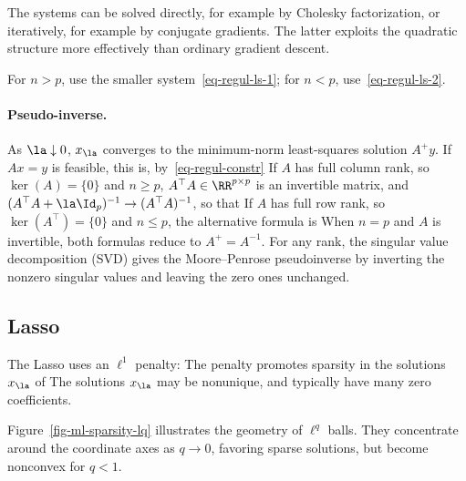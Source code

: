 The systems can be solved directly, for example by Cholesky factorization, or iteratively, for example by conjugate gradients. The latter exploits the quadratic structure more effectively than ordinary gradient descent.

For $n>p$, use the smaller system~\eqref{eq-regul-ls-1}; for $n<p$, use~\eqref{eq-regul-ls-2}.

    
\paragraph{Pseudo-inverse.}

As $\la\downarrow0$, $x_\la$ converges to the minimum-norm least-squares solution $A^+y$. If $Ax=y$ is feasible, this is, by~\eqref{eq-regul-constr}
If $A$ has full column rank, so $\ker(A)=\{0\}$ and $n\geq p$, $A^\top A \in \RR^{p \times p}$ is an invertible matrix, and $(A^\top A + \la \Id_p)^{-1} \rightarrow (A^\top A)^{-1}$, so that
If $A$ has full row rank, so $\ker(A^\top)=\{0\}$ and $n\leq p$, the alternative formula is
When $n=p$ and $A$ is invertible, both formulas reduce to $A^+=A^{-1}$. For any rank, the singular value decomposition (SVD) gives the Moore--Penrose pseudoinverse by inverting the nonzero singular values and leaving the zero ones unchanged.



                                                                        
\subsection{Lasso}

The Lasso uses an $\ell^1$ penalty:
The penalty promotes sparsity in the solutions $x_\la$ of
The solutions $x_\la$ may be nonunique, and typically have many zero coefficients.
 
Figure~\ref{fig-ml-sparsity-lq} illustrates the geometry of $\ell^q$ balls. They concentrate around the coordinate axes as $q \rightarrow 0$, favoring sparse solutions, but become nonconvex for $q<1$.



